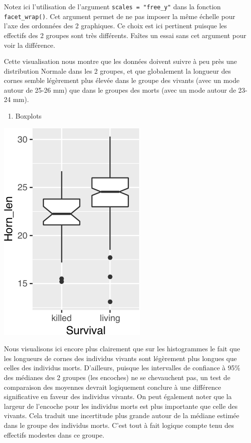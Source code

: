 \documentclass[
  a4paper,
]{article}
\newenvironment{Shaded}{\begin{snugshade}}{\end{snugshade}}
\newcommand{\DataTypeTok}[1]{\textcolor[rgb]{0.00,0.34,0.68}{#1}}
\newcommand{\KeywordTok}[1]{\textcolor[rgb]{0.12,0.11,0.11}{\textbf{#1}}}
\newcommand{\NormalTok}[1]{\textcolor[rgb]{0.12,0.11,0.11}{#1}}
\newcommand{\OperatorTok}[1]{\textcolor[rgb]{0.12,0.11,0.11}{#1}}
\newcommand{\OtherTok}[1]{\textcolor[rgb]{0.00,0.43,0.16}{#1}}
\newcommand{\StringTok}[1]{\textcolor[rgb]{0.75,0.01,0.01}{#1}}
\providecommand{\tightlist}{%
  \setlength{\itemsep}{0pt}\setlength{\parskip}{0pt}}
\begin{document}
Notez ici l'utilisation de l'argument \texttt{scales\ =\ "free\_y"} dans la fonction \texttt{facet\_wrap()}. Cet argument permet de ne pas imposer la même échelle pour l'axe des ordonnées des 2 graphiques. Ce choix est ici pertinent puisque les effectifs des 2 groupes sont très différents. Faîtes un essai sans cet argument pour voir la différence.

Cette visualisation nous montre que les données doivent suivre à peu près une distribution Normale dans les 2 groupes, et que globalement la longueur des cornes semble légèrement plus élevée dans le groupe des vivants (avec un mode autour de 25-26 mm) que dans le groupes des morts (avec un mode autour de 23-24 mm).

\begin{enumerate}
\def\labelenumi{\arabic{enumi}.}
\setcounter{enumi}{2}
\tightlist
\item
  Boxplots
\end{enumerate}

\begin{Shaded}
\end{Shaded}

\begin{center}\includegraphics[width=0.25\linewidth]{figure/unnamed-chunk-52-1} \end{center}

Nous visualisons ici encore plus clairement que sur les histogrammes le fait que les longueurs de cornes des individus vivants sont légèrement plus longues que celles des individus morts. D'ailleurs, puisque les intervalles de confiance à 95\% des médianes des 2 groupes (les encoches) ne se chevauchent pas, un test de comparaison des moyennes devrait logiquement conclure à une différence significative en faveur des individus vivants. On peut également noter que la largeur de l'encoche pour les individus morts est plus importante que celle des vivants. Cela traduit une incertitude plus grande autour de la médiane estimée dans le groupe des individus morts. C'est tout à fait logique compte tenu des effectifs modestes dans ce groupe.
\end{document}
